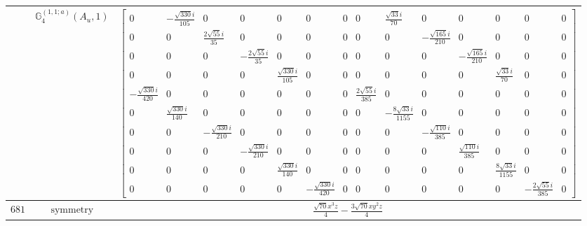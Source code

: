 \documentclass[fleqn,8pt,landscape]{jsarticle}
\begin{document}
\begin{longtable}{ccc}
$  $ & $ \mathbb{G}_{4}^{(1,1;a)}(A_{u},1) $ & $ \begin{bmatrix} 0 & - \frac{\sqrt{330} i}{105} & 0 & 0 & 0 & 0 & 0 & 0 & \frac{\sqrt{33} i}{70} & 0 & 0 & 0 & 0 & 0 \\ 0 & 0 & \frac{2 \sqrt{55} i}{35} & 0 & 0 & 0 & 0 & 0 & 0 & - \frac{\sqrt{165} i}{210} & 0 & 0 & 0 & 0 \\ 0 & 0 & 0 & - \frac{2 \sqrt{55} i}{35} & 0 & 0 & 0 & 0 & 0 & 0 & - \frac{\sqrt{165} i}{210} & 0 & 0 & 0 \\ 0 & 0 & 0 & 0 & \frac{\sqrt{330} i}{105} & 0 & 0 & 0 & 0 & 0 & 0 & \frac{\sqrt{33} i}{70} & 0 & 0 \\ - \frac{\sqrt{330} i}{420} & 0 & 0 & 0 & 0 & 0 & 0 & \frac{2 \sqrt{55} i}{385} & 0 & 0 & 0 & 0 & 0 & 0 \\ 0 & \frac{\sqrt{330} i}{140} & 0 & 0 & 0 & 0 & 0 & 0 & - \frac{8 \sqrt{33} i}{1155} & 0 & 0 & 0 & 0 & 0 \\ 0 & 0 & - \frac{\sqrt{330} i}{210} & 0 & 0 & 0 & 0 & 0 & 0 & - \frac{\sqrt{110} i}{385} & 0 & 0 & 0 & 0 \\ 0 & 0 & 0 & - \frac{\sqrt{330} i}{210} & 0 & 0 & 0 & 0 & 0 & 0 & \frac{\sqrt{110} i}{385} & 0 & 0 & 0 \\ 0 & 0 & 0 & 0 & \frac{\sqrt{330} i}{140} & 0 & 0 & 0 & 0 & 0 & 0 & \frac{8 \sqrt{33} i}{1155} & 0 & 0 \\ 0 & 0 & 0 & 0 & 0 & - \frac{\sqrt{330} i}{420} & 0 & 0 & 0 & 0 & 0 & 0 & - \frac{2 \sqrt{55} i}{385} & 0 \end{bmatrix} $ \\ \hline
$ 681 $ & $ \text{symmetry} $ & $ \frac{\sqrt{70} x^{3} z}{4} - \frac{3 \sqrt{70} x y^{2} z}{4} $ \\

\end{longtable}
\end{document}
